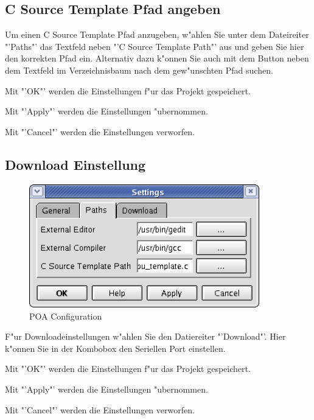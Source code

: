 \documentclass[a4paper,titlepage,12pt,ngerman]{scrbook}
\begin{document}
\subsection{C Source Template Pfad angeben}
Um einen C Source Template Pfad anzugeben, w"ahlen Sie unter dem Dateireiter "'Paths"' das Textfeld neben "'C Source Template Path"' aus und geben Sie hier den korrekten Pfad ein. Alternativ dazu k"onnen Sie auch mit dem Button neben dem Textfeld im Verzeichnisbaum nach dem gew"unschten Pfad suchen. \par
Mit "'OK"' werden die Einstellungen f"ur das Projekt gespeichert.\par
Mit "'Apply"' werden die Einstellungen "ubernommen.\par
Mit "'Cancel"' werden die Einstellungen verworfen.\par 

\subsection{Download Einstellung}
\begin{figure}[htbp]
\begin{center}
\includegraphics[width=10cm]{POAConfiguration2}
\caption{POA Configuration}\label{test}
\end{center}
\end{figure}
F"ur Downloadeinstellungen w"ahlen Sie den Datiereiter "'Download"'. Hier k"onnen Sie in der Kombobox den Seriellen Port einstellen.\par 
Mit "'OK"' werden die Einstellungen f"ur das Projekt gespeichert.\par
Mit "'Apply"' werden die Einstellungen "ubernommen.\par
Mit "'Cancel"' werden die Einstellungen verworfen.\par 


\end{document}
